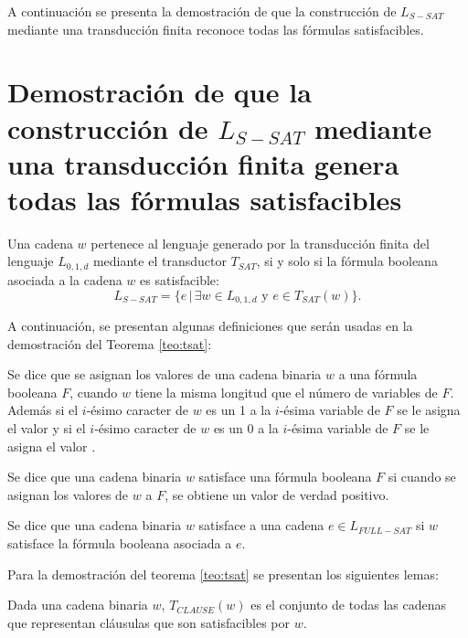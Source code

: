 A continuación se presenta la demostración de que la construcción de $L_{S-SAT}$ mediante una transducción finita reconoce todas las fórmulas satisfacibles.

\section{Demostración de que la construcción de $L_{S-SAT}$ mediante una transducción finita
  genera todas las fórmulas satisfacibles}

\begin{theorem}
    \label{teo:tsat}
    Una cadena $w$ pertenece al lenguaje generado por la transducción finita del lenguaje $L_{0,1,d}$
    mediante el transductor $T_{SAT}$, si y solo si la fórmula booleana asociada a la cadena $w$ es satisfacible:
    $$L_{S-SAT} = \{e\,|\,\exists w \in L_{0,1,d} \text{ y } e \in T_{SAT}(w) \}.$$
\end{theorem}

A continuación, se presentan algunas definiciones que serán usadas en la demostración del Teorema \ref{teo:tsat}:

\begin{definition}
    Se dice que se asignan los valores de una cadena binaria $w$ a una fórmula booleana $F$, cuando $w$ tiene la misma longitud
    que el número de variables de $F$. Además si el $i$-ésimo caracter de $w$ es un 1 a la $i$-ésima variable de $F$ se le asigna
    el valor \true{} y si el $i$-ésimo caracter de $w$ es un 0 a la $i$-ésima variable de $F$ se le asigna
    el valor \false{}.
\end{definition}

\begin{definition}
    Se dice que una cadena binaria $w$ satisface una fórmula booleana $F$ si cuando se asignan los valores de $w$ a $F$, se obtiene un valor de verdad positivo.
\end{definition}

\begin{definition}
    Se dice que una cadena binaria $w$ satisface a una cadena $e\in L_{FULL-SAT}$ si $w$ satisface la fórmula booleana asociada a $e$. 
\end{definition}

Para la demostración del teorema \ref{teo:tsat} se presentan los siguientes lemas:

\begin{lemma}
    \label{lem:clause}
    Dada una cadena binaria $w$, $T_{CLAUSE}(w)$ es el conjunto de todas las cadenas que representan cláusulas que son satisfacibles por $w$.
\end{lemma}

